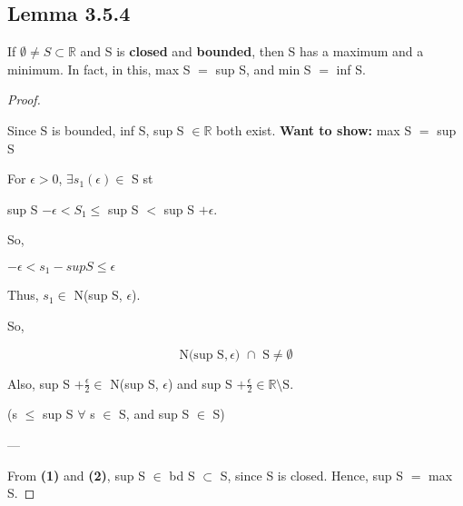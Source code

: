 \documentclass{article}
\newcommand\ssc[2][\DefaultOpt]{%
  \def\DefaultOpt{#2}%
  \subsection[#1]{#2}%
}
\newcommand{\bgpf}{\begin{proof} $ $\newline}
\newcommand{\wts}[1]{\textbf{Want to show: } #1}
\newcommand{\bpth}[1]{\textbf{(#1)}}
\newcommand{\step}[2]{\begin{equation}\tag{#2}#1\end{equation}}
\newcommand{\epf}{\end{proof}}
\newcommand{\br}{\mathbb{R}}       %
\newcommand{\ep}{\epsilon}         %
\newcommand{\fa}{\forall}          %
\newcommand{\es}{\emptyset}        %
\newcommand{\sbs}{\subset}         %
\newcommand{\butnot}[2]{#1\setminus{\textrm{#2}}}
\newcommand{\nbho}[3]{\textrm{N(}#1, #2\textrm{) }\cap \textrm{ #3} \neq \emptyset}
\begin{document}
\ssc{Lemma 3.5.4}{
If $\es \neq S \sbs \br$ and S is \textbf{closed} and \textbf{bounded}, then S has a maximum and a minimum. In fact, in this, max S $=$ sup S, and min S $=$ inf S.

\bgpf

Since S is bounded, inf S, sup S $\in \br$ both exist.
\wts{max S $=$ sup S}

For $\epsilon > 0$, $\exists s_1 (\ep) \in$ S st \

sup S $- \ep < S_1 \leq$ sup S $<$ sup S $+ \ep$.

So,

$-\ep < s_1 - sup S \leq \ep$

Thus, $s_1 \in$ N(sup S, $\ep$). \

So, 

\step{\nbho{\textrm{sup S}}{\ep}{S}}{1}

Also, sup S $+ \frac{\epsilon}{2} \in$ N(sup S, $\ep$) and sup S $+ \frac{\epsilon}{2} \in \butnot{\br}{S}$.

(s $\leq$ sup S $\fa$ s $\in$ S, and sup S $\in$ S)

---


From \bpth{1} and \bpth{2}, sup S $\in$ bd S $\sbs$ S, since S is closed. Hence, sup S $=$ max S.

\epf
}
\end{document}
